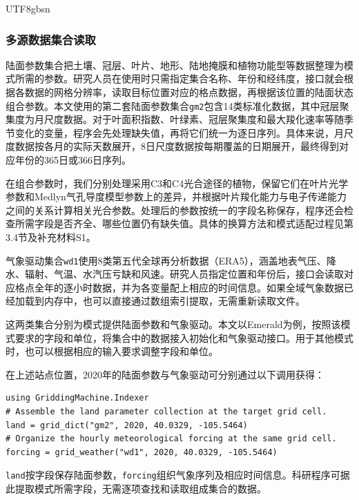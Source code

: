 \documentclass[numdoi]{chinese}
\begin{document}
\begin{CJK}{UTF8}{gbsn}
\subsubsection{多源数据集合读取}

陆面参数集合把土壤、\allowbreak{}冠层、\allowbreak{}叶片、\allowbreak{}地形、\allowbreak{}陆地掩膜和植物功能型等数据整理为模式所需的参数。研究人员在使用时只需指定集合名称、\allowbreak{}年份和经纬度，接口就会根据各数据的网格分辨率，读取目标位置对应的格点数据，再根据该位置的陆面状态组合参数。本文使用的第二套陆面参数集合\nolinkurl{gm2}包含14类标准化数据，其中冠层聚集度为月尺度数据。对于叶面积指数、\allowbreak{}叶绿素、\allowbreak{}冠层聚集度和最大羧化速率等随季节变化的变量，程序会先处理缺失值，再将它们统一为逐日序列。具体来说，月尺度数据按各月的实际天数展开，8日尺度数据按每期覆盖的日期展开，最终得到对应年份的365日或366日序列。

在组合参数时，我们分别处理采用C3和C4光合途径的植物，保留它们在叶片光学参数和Medlyn气孔导度模型参数上的差异\cite{ref3,ref4}，并根据叶片羧化能力与电子传递能力之间的关系计算相关光合参数\cite{ref5}。处理后的参数按统一的字段名称保存，程序还会检查所需字段是否齐全、\allowbreak{}哪些位置仍有缺失值。具体的换算方法和模式适配过程见第3.4节及补充材料S1。

气象驱动集合\nolinkurl{wd1}使用8类第五代全球再分析数据（ERA5）\cite{ref6}，涵盖地表气压、\allowbreak{}降水、\allowbreak{}辐射、\allowbreak{}气温、\allowbreak{}水汽压亏缺和风速。研究人员指定位置和年份后，接口会读取对应格点全年的逐小时数据，并为各变量配上相应的时间信息。如果全域气象数据已经加载到内存中，也可以直接通过数组索引提取，无需重新读取文件。

这两类集合分别为模式提供陆面参数和气象驱动。本文以Emerald为例，按照该模式要求的字段和单位，将集合中的数据接入初始化和气象驱动接口。用于其他模式时，也可以根据相应的输入要求调整字段和单位。

在上述站点位置，2020年的陆面参数与气象驱动可分别通过以下调用获得：

\begingroup\singlespacing
\begin{Verbatim}[fontsize=\small,frame=single,framesep=5pt]
using GriddingMachine.Indexer
# Assemble the land parameter collection at the target grid cell.
land = grid_dict("gm2", 2020, 40.0329, -105.5464)
# Organize the hourly meteorological forcing at the same grid cell.
forcing = grid_weather("wd1", 2020, 40.0329, -105.5464)
\end{Verbatim}
\endgroup

\nolinkurl{land}按字段保存陆面参数，\nolinkurl{forcing}组织气象序列及相应时间信息。科研程序可据此提取模式所需字段，无需逐项查找和读取组成集合的数据。


\end{CJK}
\end{document}
